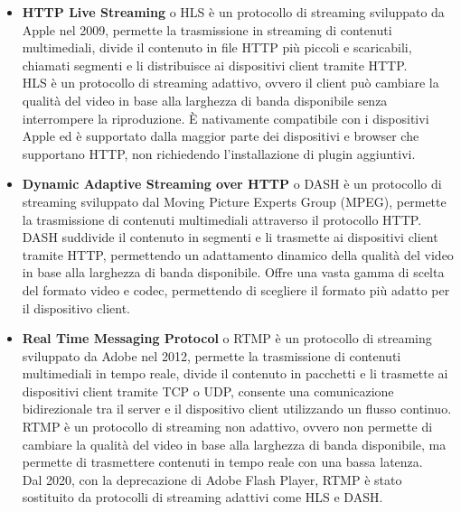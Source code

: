 \begin{itemize}

    \item \textbf{HTTP Live Streaming} o HLS è un protocollo di streaming sviluppato da Apple nel 2009, permette la trasmissione in streaming di contenuti multimediali,
    divide il contenuto in file HTTP più piccoli e scaricabili, chiamati segmenti e li distribuisce ai dispositivi client tramite HTTP.\\
    HLS è un protocollo di streaming adattivo, ovvero il client può cambiare la qualità del video in base alla larghezza di banda disponibile senza interrompere la riproduzione.
    È nativamente compatibile con i dispositivi Apple ed è supportato dalla maggior parte dei dispositivi e browser che supportano HTTP, non richiedendo l'installazione di plugin aggiuntivi.\\

    \item \textbf{Dynamic Adaptive Streaming over HTTP} o DASH è un protocollo di streaming sviluppato dal Moving Picture Experts Group (MPEG), permette la trasmissione di contenuti multimediali
    attraverso il protocollo HTTP.\\
    DASH suddivide il contenuto in segmenti e li trasmette ai dispositivi client tramite HTTP, permettendo un adattamento dinamico della qualità del video in base alla larghezza di banda disponibile.
    Offre una vasta gamma di scelta del formato video e codec, permettendo di scegliere il formato più adatto per il dispositivo client.\\

    \item \textbf{Real Time Messaging Protocol} o RTMP è un protocollo di streaming sviluppato da Adobe nel 2012, permette la trasmissione di contenuti multimediali in tempo reale,
    divide il contenuto in pacchetti e li trasmette ai dispositivi client tramite TCP o UDP, consente una comunicazione bidirezionale tra il server e il dispositivo client utilizzando un flusso continuo.\\
    RTMP è un protocollo di streaming non adattivo, ovvero non permette di cambiare la qualità del video in base alla larghezza di banda disponibile, ma permette di 
    trasmettere contenuti in tempo reale con una bassa latenza.\\
    Dal 2020, con la deprecazione di Adobe Flash Player, RTMP è stato sostituito da protocolli di streaming adattivi come HLS e DASH.\\
    \end{itemize}

